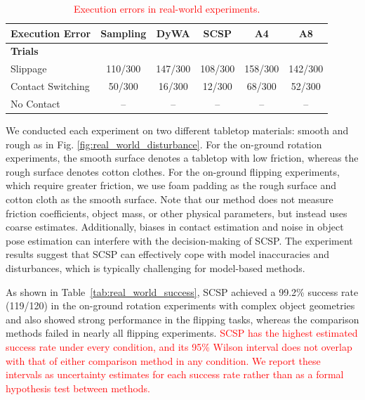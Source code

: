 \begin{table}[t]
\centering
\color{red}
\caption{\textcolor{red}{Execution errors in real-world experiments.}}
\label{tab:scsp_execution_errors}
\setlength{\tabcolsep}{2pt}
\renewcommand{\arraystretch}{1.05}
\scriptsize
\begin{tabular}{@{}l*{5}{c}@{}}
\toprule
\textbf{Execution Error} & Sampling & DyWA & \textbf{SCSP} & A4 & A8 \\
\midrule
\multicolumn{6}{l}{\textbf{Trials}} \\
Slippage & 110/300 & 147/300 & 108/300 & 158/300 & 142/300 \\
Contact Switching & 50/300 & 16/300 & 12/300 & 68/300 & 52/300 \\
No Contact & -- & -- & -- & -- & -- \\
\bottomrule
\end{tabular}
\end{table}

We conducted each experiment on two different tabletop materials: smooth and rough as in Fig. \ref{fig:real_world_disturbance}. For the on-ground rotation experiments, the smooth surface denotes a tabletop with low friction, whereas the rough surface denotes cotton clothes. For the on-ground flipping experiments, which require greater friction, we use foam padding as the rough surface and cotton cloth as the smooth surface. Note that our method does not measure friction coefficients, object mass, or other physical parameters, but instead uses coarse estimates. Additionally, biases in contact estimation and noise in object pose estimation can interfere with the decision-making of SCSP. The experiment results suggest that SCSP can effectively cope with model inaccuracies and disturbances, which is typically challenging for model-based methods.

As shown in Table~\ref{tab:real_world_success}, SCSP achieved a 99.2\% success rate (119/120) in the on-ground rotation experiments with complex object geometries and also showed strong performance in the flipping tasks, whereas the comparison methods failed in nearly all flipping experiments.  \textcolor{red}{SCSP has the highest estimated success rate under every condition, and its 95\% Wilson interval does not overlap with that of either comparison method in any condition. We report these intervals as uncertainty estimates for each success rate rather than as a formal hypothesis test between methods.} 

